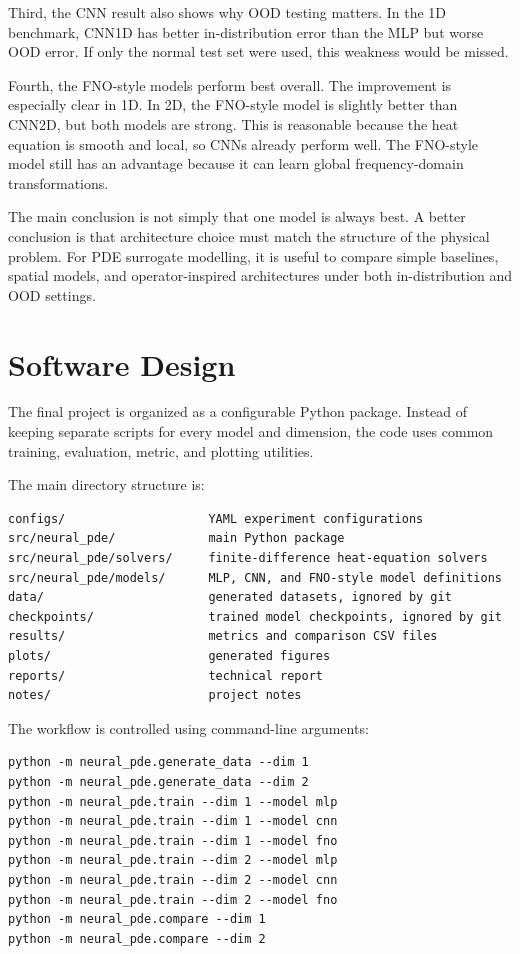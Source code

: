 \documentclass[11pt,a4paper]{article}
\begin{document}
Third, the CNN result also shows why OOD testing matters. In the 1D benchmark, CNN1D has better in-distribution error than the MLP but worse OOD error. If only the normal test set were used, this weakness would be missed.

Fourth, the FNO-style models perform best overall. The improvement is especially clear in 1D. In 2D, the FNO-style model is slightly better than CNN2D, but both models are strong. This is reasonable because the heat equation is smooth and local, so CNNs already perform well. The FNO-style model still has an advantage because it can learn global frequency-domain transformations.

The main conclusion is not simply that one model is always best. A better conclusion is that architecture choice must match the structure of the physical problem. For PDE surrogate modelling, it is useful to compare simple baselines, spatial models, and operator-inspired architectures under both in-distribution and OOD settings.

\section{Software Design}

The final project is organized as a configurable Python package. Instead of keeping separate scripts for every model and dimension, the code uses common training, evaluation, metric, and plotting utilities.

The main directory structure is:
\begin{verbatim}
configs/                    YAML experiment configurations
src/neural_pde/             main Python package
src/neural_pde/solvers/     finite-difference heat-equation solvers
src/neural_pde/models/      MLP, CNN, and FNO-style model definitions
data/                       generated datasets, ignored by git
checkpoints/                trained model checkpoints, ignored by git
results/                    metrics and comparison CSV files
plots/                      generated figures
reports/                    technical report
notes/                      project notes
\end{verbatim}

The workflow is controlled using command-line arguments:
\begin{verbatim}
python -m neural_pde.generate_data --dim 1
python -m neural_pde.generate_data --dim 2
python -m neural_pde.train --dim 1 --model mlp
python -m neural_pde.train --dim 1 --model cnn
python -m neural_pde.train --dim 1 --model fno
python -m neural_pde.train --dim 2 --model mlp
python -m neural_pde.train --dim 2 --model cnn
python -m neural_pde.train --dim 2 --model fno
python -m neural_pde.compare --dim 1
python -m neural_pde.compare --dim 2
\end{verbatim}
\end{document}
